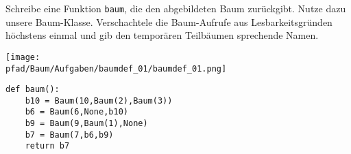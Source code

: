 \question[3]
Schreibe eine Funktion \texttt{baum}, die den abgebildeten Baum zurückgibt.
Nutze dazu unsere Baum-Klasse.
Verschachtele die Baum-Aufrufe aus Lesbarkeitsgründen
höchstens einmal und gib den temporären Teilbäumen sprechende Namen.

\texttt{[image: \\pfad/Baum/Aufgaben/baumdef\_01/baumdef\_01.png]}

\begin{solutionbox}{5cm}
\begin{lstlisting}
def baum():
    b10 = Baum(10,Baum(2),Baum(3))
    b6 = Baum(6,None,b10)
    b9 = Baum(9,Baum(1),None)
    b7 = Baum(7,b6,b9)
    return b7
\end{lstlisting}
\end{solutionbox}

